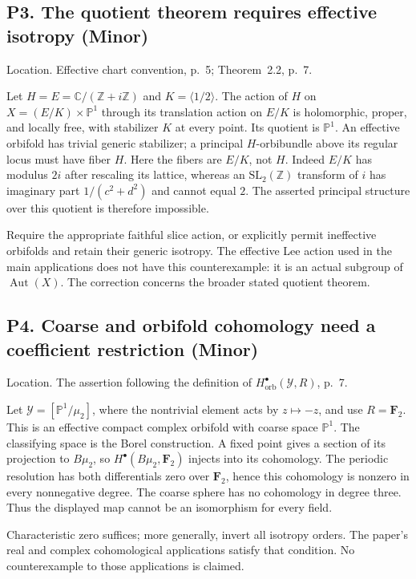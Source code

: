 \documentclass[10pt]{article}
\begin{document}
\subsection*{P3. The quotient theorem requires effective isotropy (Minor)}
Location. Effective chart convention, p. 5; Theorem 2.2, p. 7.\par
Let \(H=E=\mathbb C/(\mathbb Z+i\mathbb Z)\) and \(K=\langle1/2\rangle\). The action of \(H\) on \(X=(E/K)\times\mathbb P^1\) through its translation action on \(E/K\) is holomorphic, proper, and locally free, with stabilizer \(K\) at every point. Its quotient is \(\mathbb P^1\). An effective orbifold has trivial generic stabilizer; a principal \(H\)-orbibundle above its regular locus must have fiber \(H\). Here the fibers are \(E/K\), not \(H\). Indeed \(E/K\) has modulus \(2i\) after rescaling its lattice, whereas an \(\mathrm{SL}_2(\mathbb Z)\) transform of \(i\) has imaginary part \(1/(c^2+d^2)\) and cannot equal \(2\). The asserted principal structure over this quotient is therefore impossible.\par
Require the appropriate faithful slice action, or explicitly permit ineffective orbifolds and retain their generic isotropy. The effective Lee action used in the main applications does not have this counterexample: it is an actual subgroup of \(\operatorname{Aut}(X)\). The correction concerns the broader stated quotient theorem.\par
\subsection*{P4. Coarse and orbifold cohomology need a coefficient restriction (Minor)}
Location. The assertion following the definition of \(H^\bullet_{\mathrm{orb}}(\mathcal Y,R)\), p. 7.\par
Let \(\mathcal Y=[\mathbb P^1/\mu_2]\), where the nontrivial element acts by \(z\mapsto-z\), and use \(R=\mathbf F_2\). This is an effective compact complex orbifold with coarse space \(\mathbb P^1\). The classifying space is the Borel construction. A fixed point gives a section of its projection to \(B\mu_2\), so \(H^\bullet(B\mu_2,\mathbf F_2)\) injects into its cohomology. The periodic resolution has both differentials zero over \(\mathbf F_2\), hence this cohomology is nonzero in every nonnegative degree. The coarse sphere has no cohomology in degree three. Thus the displayed map cannot be an isomorphism for every field.\par
Characteristic zero suffices; more generally, invert all isotropy orders. The paper’s real and complex cohomological applications satisfy that condition. No counterexample to those applications is claimed.\par
\end{document}
